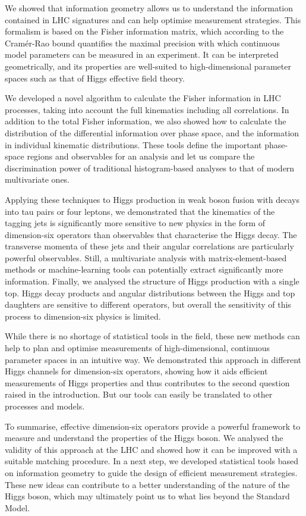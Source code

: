 We showed that information geometry allows us to understand the
information contained in LHC signatures and can help optimise
measurement strategies. This formalism is based on the Fisher
information matrix, which according to the Cram\'er-Rao bound
quantifies the maximal precision with which continuous model
parameters can be measured in an experiment. It can be interpreted
geometrically, and its properties are well-suited to high-dimensional
parameter spaces such as that of Higgs effective field theory.

We developed a novel algorithm to calculate the Fisher information in
LHC processes, taking into account the full kinematics including all
correlations. In addition to the total Fisher information, we also
showed how to calculate the distribution of the differential
information over phase space, and the information in individual
kinematic distributions. These tools define the important phase-space
regions and observables for an analysis and let us compare the
discrimination power of traditional histogram-based analyses to that
of modern multivariate ones.

Applying these techniques to Higgs production in weak boson fusion
with decays into tau pairs or four leptons, we demonstrated that the
kinematics of the tagging jets is significantly more sensitive to new
physics in the form of dimension-six operators than observables that
characterise the Higgs decay.  The transverse momenta of these jets
and their angular correlations are particularly powerful
observables. Still, a multivariate analysis with matrix-element-based
methods or machine-learning tools can potentially extract
significantly more information. Finally, we analysed the structure of
Higgs production with a single top. Higgs decay products and angular
distributions between the Higgs and top daughters are sensitive to
different operators, but overall the sensitivity of this process to
dimension-six physics is limited.

%
While there is no shortage of statistical tools in the field, these
new methods can help to plan and optimise measurements of
high-dimensional, continuous parameter spaces in an intuitive way.  We
demonstrated this approach in different Higgs channels for
dimension-six operators, showing how it aids efficient measurements of
Higgs properties and thus contributes to the second question raised in
the introduction. But our tools can easily be translated to other
processes and models.

\newparagraph
%
To summarise, effective dimension-six operators provide a powerful
framework to measure and understand the properties of the Higgs
boson. We analysed the validity of this approach at the LHC and showed
how it can be improved with a suitable matching procedure. In a next
step, we developed statistical tools based on information geometry to
guide the design of efficient measurement strategies. These new ideas
can contribute to a better understanding of the nature of the Higgs
boson, which may ultimately point us to what lies beyond the Standard
Model.
